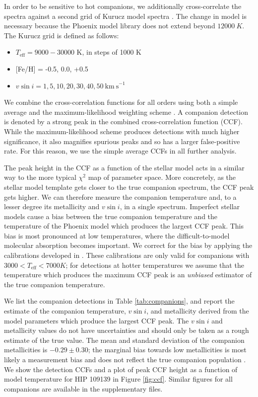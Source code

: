 \documentclass{emulateapj}
\begin{document}
In order to be sensitive to hot companions, we additionally cross-correlate the spectra against a second grid of Kurucz model spectra \citep{Castelli2003}. The change in model is necessary because the Phoenix model library does not extend beyond $12000\ K$. The Kurucz grid is defined as follows:

\begin{itemize}
\item $T_\mathrm{eff} = 9000-30000$ K, in steps of 1000 K
\item {[}Fe/H{]} = -0.5, 0.0, +0.5
\item $v\sin{i} = 1, 5, 10, 20, 30, 40, 50 \ \mathrm{km\ s}^{-1}$
\end{itemize}

We combine the cross-correlation functions for all orders using both a simple average and the maximum-likelihood weighting scheme \citep{Zucker2003}. A companion detection is denoted by a strong peak in the combined cross-correlation function (CCF). While the maximum-likelihood scheme produces detections with much higher significance, it also magnifies spurious peaks and so has a larger false-positive rate. For this reason, we use the simple average CCFs in all further analysis.

The peak height in the CCF as a function of the stellar model acts in a similar way to the more typical $\chi^2$ map of parameter space. More concretely, as the stellar model template gets closer to the true companion spectrum, the CCF peak gets higher. We can therefore measure the companion temperature and, to a lesser degree its metallicity and $v\sin{i}$, in a single spectrum. Imperfect stellar models cause a bias between the true companion temperature and the temperature of the Phoenix model which produces the largest CCF peak. This bias is most pronounced at low temperatures, where the difficult-to-model molecular absorption becomes important. We correct for the bias by applying the calibrations developed in \citet{Gullikson2016}. These calibrations are only valid for companions with $3000 < T_\mathrm{eff} < 7000 K$; for detections at hotter temperatures we assume that the temperature which produces the maximum CCF peak is an \emph{unbiased} estimator of the true companion temperature.

We list the companion detections in Table \ref{tab:companions}, and report the estimate of the companion temperature, $v\sin{i}$, and metallicity derived from the model parameters which produce the largest CCF peak. The $v\sin{i}$ and metallicity values do not have uncertainties and should only be taken as a rough estimate of the true value. The mean and standard deviation of the companion metallicities is $-0.29 \pm 0.30$; the marginal bias towards low metallicities is most likely a measurement bias and does not reflect the true companion population \citep{Gullikson2016}.  We show the detection CCFs and a plot of peak CCF height as a function of model temperature for HIP 109139 in Figure \ref{fig:ccf}. Similar figures for all companions are available in the supplementary files.
\end{document}
